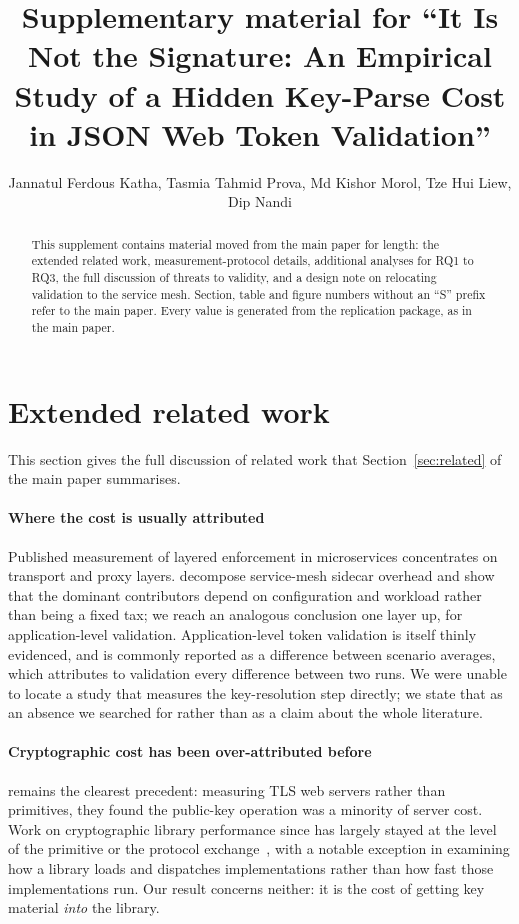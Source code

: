 \documentclass[preprint,12pt,authoryear]{elsarticle}
\begin{document}
\begin{frontmatter}
\title{Supplementary material for ``It Is Not the Signature: An Empirical Study
of a Hidden Key-Parse Cost in JSON Web Token Validation''}
\author{Jannatul Ferdous Katha, Tasmia Tahmid Prova, Md Kishor Morol, Tze Hui
Liew, Dip Nandi}
\begin{abstract}
This supplement contains material moved from the main paper for length: the
extended related work, measurement-protocol details, additional analyses for
RQ1 to RQ3, the full discussion of threats to validity, and a design note on
relocating validation to the service mesh. Section, table and figure numbers
without an ``S'' prefix refer to the main paper. Every value is generated
from the replication package, as in the main paper.
\end{abstract}
\end{frontmatter}

\section{Extended related work}

This section gives the full discussion of related work that Section~\ref{sec:related}
of the main paper summarises.

\paragraph{Where the cost is usually attributed} Published measurement of
layered enforcement in microservices concentrates on transport and proxy
layers. \citet{zhu2023dissecting} decompose service-mesh sidecar
overhead and show that the dominant contributors depend on configuration and
workload rather than being a fixed tax; we reach an analogous conclusion one
layer up, for application-level validation. Application-level token validation
is itself thinly evidenced, and is commonly reported as a difference between
scenario averages, which attributes to validation every difference between two
runs. We were unable to locate a study that measures the key-resolution step
directly;
we state that as an absence we searched for rather than as a claim about the
whole literature.

\paragraph{Cryptographic cost has been over-attributed before} \citet{coarfa2006performance} remains the clearest precedent: measuring TLS
web servers rather than primitives, they found the public-key operation was a
minority of server cost. Work on cryptographic library performance since has
largely stayed at the level of the primitive or the protocol
exchange~\citep{naser2020performance,sikeridis2020assessing}, with \citet{tuveri2019engines} a notable exception in examining how a library
loads and dispatches implementations rather than how fast those
implementations run. Our result concerns neither: it is the cost of getting key
material \emph{into} the library.
\end{document}
